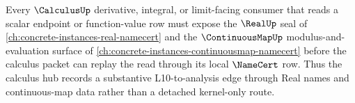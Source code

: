 \begin{theorem}
\label{thm:calculus-real-continuous-dependency-route}
Every $\CalculusUp$ derivative, integral, or limit-facing consumer that reads a scalar endpoint or function-value row must expose the $\RealUp$ seal of \autoref{ch:concrete-instances-real-namecert} and the $\ContinuousMapUp$ modulus-and-evaluation surface of \autoref{ch:concrete-instances-continuousmap-namecert} before the calculus packet can replay the read through its local $\NameCert$ row. Thus the calculus hub records a substantive L10-to-analysis edge through Real names and continuous-map data rather than a detached kernel-only route.
\end{theorem}
